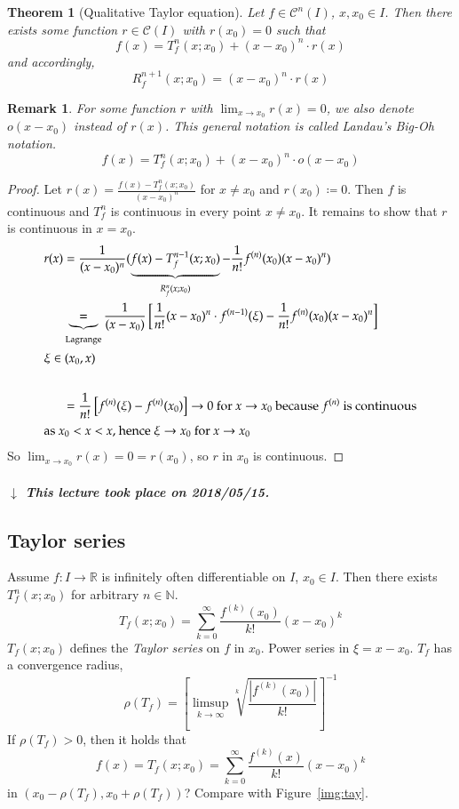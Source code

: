 \documentclass{article}
\newtheorem{theorem}{Theorem}  \numberwithin{theorem}{section}
\newtheorem{remark}{Remark}  \numberwithin{remark}{section}
\newcommand{\card}[1]{\left|#1\right|}
\newcommand{\dateref}[1]{%
  \begin{mdframed}[backgroundcolor=gray!10,innerbottommargin=0pt,innertopmargin=0pt]
    \paragraph{\textit{$\downarrow$ This lecture took place on #1.}}%
  \end{mdframed}%
}
\begin{document}
\begin{theorem}[Qualitative Taylor equation]
  Let $f \in \mathcal C^n(I)$, $x, x_0 \in I$. Then there exists some function $r \in \mathcal C(I)$ with $r(x_0) = 0$ such that
  \[ f(x) = T_f^n(x; x_0) + (x - x_0)^n \cdot r(x) \]
  and accordingly,
  \[ R_f^{n+1}(x; x_0) = (x - x_0)^n \cdot r(x) \]
\end{theorem}

\begin{remark}
  For some function $r$ with $\lim_{x\to x_0} r(x) = 0$, we also denote $o(x - x_0)$ instead of $r(x)$.
  This general notation is called Landau's Big-Oh notation.
  \[ f(x) = T_f^n(x; x_0) + (x - x_0)^n \cdot o(x - x_0) \]
\end{remark}

\begin{proof}
  Let $r(x) = \frac{f(x) - T_f^n(x; x_0)}{(x - x_0)^n}$ for $x \neq x_0$ and $r(x_0) \coloneqq 0$.
  Then $f$ is continuous and $T_f^n$ is continuous in every point $x \neq x_0$.
  It remains to show that $r$ is continuous in $x = x_0$.
  \begin{align*}
    r(x) &= \frac{1}{(x - x_0)^n} (\underbrace{f(x) - T_f^{n-1}(x; x_0)}_{R_f^n(x; x_0)} - \frac1{n!} f^{(n)}(x_0)(x - x_0)^n) \\
      &\underbrace{=}_{\text{Lagrange}} \frac{1}{(x - x_0)} \left[ \frac{1}{n!} (x - x_0)^n \cdot f^{(n-1)}(\xi) - \frac{1}{n!} f^{(n)}(x_0)(x - x_0)^n \right] \\
    \intertext{$\xi \in (x_0, x)$} \\
      &= \frac{1}{n!} \left[f^{(n)}(\xi) - f^{(n)}(x_0)\right] \to 0 \text{ for } x \to x_0 \text{ because } f^{(n)} \text{ is continuous} \\
    \intertext{as $x_0 < x < x$, hence $\xi \to x_0$ for $x \to x_0$} 
  \end{align*}
  So $\lim_{x\to x_0} r(x) = 0 = r(x_0)$, so $r$ in $x_0$ is continuous.
\end{proof}

\dateref{2018/05/15}

\subsection{Taylor series}

Assume $f: I \to \mathbb R$ is infinitely often differentiable on $I$, $x_0 \in I$. Then there exists $T_f^n(x; x_0)$ for arbitrary $n \in \mathbb N$.
\[ T_f(x; x_0) = \sum_{k=0}^\infty \frac{f^{(k)}(x_0)}{k!} (x - x_0)^k \]
$T_f(x; x_0)$ defines the \emph{Taylor series} on $f$ in $x_0$.
Power series in $\xi = x - x_0$.
$T_f$ has a convergence radius,
\[ \rho(T_f) = \left[\limsup_{k\to\infty} \sqrt[k]{\frac{\card{f^{(k)}(x_0)}}{k!}}\right]^{-1} \]
If $\rho(T_f) > 0$, then it holds that
\[ f(x) = T_f(x; x_0) = \sum_{k=0}^\infty \frac{f^{(k)}(x)}{k!} (x - x_0)^k \]
in $(x_0 - \rho(T_f), x_0 + \rho(T_f))$?
Compare with Figure~\ref{img:tay}.
\end{document}
